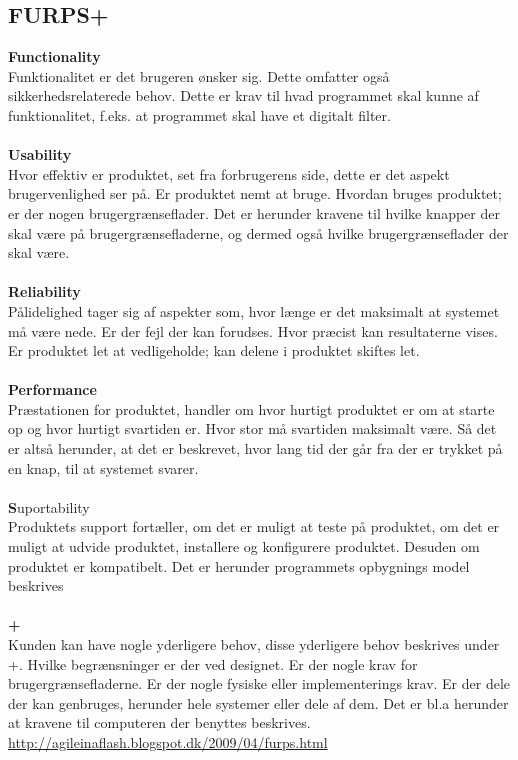 \subsection{FURPS+}
\textbf{Functionality}\\
Funktionalitet er det brugeren ønsker sig. Dette omfatter også sikkerhedsrelaterede behov. Dette er krav til hvad programmet skal kunne af funktionalitet, f.eks. at programmet skal have et digitalt filter.\\\\
\textbf{Usability}\\
Hvor effektiv er produktet, set fra forbrugerens side, dette er det aspekt brugervenlighed ser på. Er produktet nemt at bruge. Hvordan bruges produktet; er der nogen brugergrænseflader. Det er herunder kravene til hvilke knapper der skal være på brugergrænsefladerne, og dermed også hvilke brugergrænseflader der skal være.\\\\
\textbf{Reliability}\\
Pålidelighed tager sig af aspekter som, hvor længe er det maksimalt at systemet må være nede. Er der fejl der kan forudses. Hvor præcist kan resultaterne vises. Er produktet let at vedligeholde; kan delene i produktet skiftes let.\\\\
\textbf{Performance}\\
Præstationen for produktet, handler om hvor hurtigt produktet er om at starte op og hvor hurtigt svartiden er. Hvor stor må svartiden maksimalt være. Så det er altså herunder, at det er beskrevet, hvor lang tid der går fra der er trykket på en knap, til at systemet svarer. \\\\
\textbf{S}uportability\\
Produktets support fortæller, om det er muligt at teste på produktet, om det er muligt at udvide produktet, installere og konfigurere produktet. Desuden om produktet er kompatibelt. Det er herunder programmets opbygnings model beskrives\\\\
\textbf{+}\\
Kunden kan have nogle yderligere behov, disse yderligere behov beskrives under +. Hvilke begrænsninger er der ved designet. Er der nogle krav for brugergrænsefladerne. Er der nogle fysiske eller implementerings krav. Er der dele der kan genbruges, herunder hele systemer eller dele af dem. Det er bl.a herunder at kravene til computeren der benyttes beskrives.\\
\url{http://agileinaflash.blogspot.dk/2009/04/furps.html}

